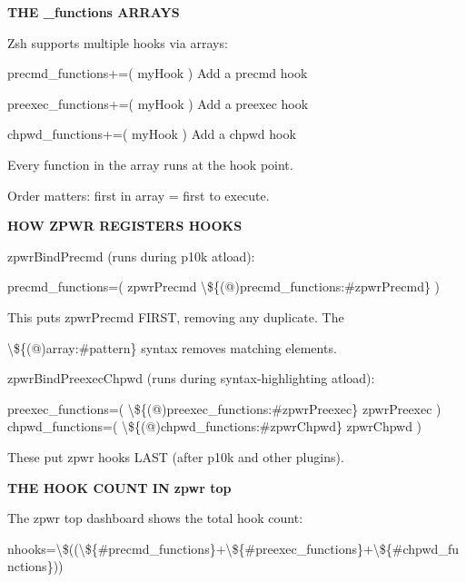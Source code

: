 \documentclass[11pt,a4paper,twoside]{book}
\begin{document}
\vspace{12pt}
{\bfseries\color{neonyellow} THE \_functions ARRAYS}\vspace{4pt}

Zsh supports multiple hooks via arrays:

precmd\_functions+=( myHook )      Add a precmd hook

preexec\_functions+=( myHook )     Add a preexec hook

chpwd\_functions+=( myHook )       Add a chpwd hook

Every function in the array runs at the hook point.

Order matters: first in array = first to execute.


\vspace{12pt}
{\bfseries\color{neonyellow} HOW ZPWR REGISTERS HOOKS}\vspace{4pt}

zpwrBindPrecmd (runs during p10k atload):

\begin{codebox}
precmd\_functions=( zpwrPrecmd \textbackslash{}\$\{(@)precmd\_functions:\#zpwrPrecmd\} )\\
\end{codebox}

This puts zpwrPrecmd FIRST, removing any duplicate. The

\textbackslash{}\$\{(@)array:\#pattern\} syntax removes matching elements.

zpwrBindPreexecChpwd (runs during syntax-highlighting atload):

\begin{codebox}
preexec\_functions=( \textbackslash{}\$\{(@)preexec\_functions:\#zpwrPreexec\} zpwrPreexec )\\
chpwd\_functions=( \textbackslash{}\$\{(@)chpwd\_functions:\#zpwrChpwd\} zpwrChpwd )\\
\end{codebox}

These put zpwr hooks LAST (after p10k and other plugins).


\vspace{12pt}
{\bfseries\color{neonyellow} THE HOOK COUNT IN zpwr top}\vspace{4pt}

\begin{codebox}
The zpwr top dashboard shows the total hook count:\\
\end{codebox}

nhooks=\textbackslash{}\$((\textbackslash{}\$\{\#precmd\_functions\}+\textbackslash{}\$\{\#preexec\_functions\}+\textbackslash{}\$\{\#chpwd\_functions\}))
\end{document}
